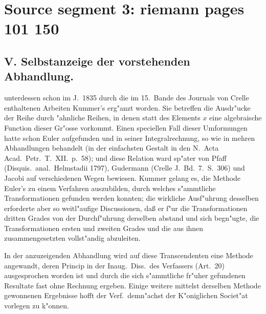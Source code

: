 \documentclass[12pt,a4paper]{book}
\theoremstyle{definition}
\theoremstyle{remark}
\begin{document}
\vspace{1em}
\tableofcontents

\clearpage
\chapter*{Source segment 3: riemann pages 101 150}
\maketitle
\thispagestyle{empty}
\tableofcontents
\newpage

\section*{V. Selbstanzeige der vorstehenden Abhandlung.}
\label{sec:selbstanzeige}

unterdessen schon im J.\ 1835 durch die im 15.\ Bande des Journals
von Crelle enthaltenen Arbeiten Kummer's erg"anzt worden. Sie betreffen
die Ausdr"ucke der Reihe durch "ahnliche Reihen, in denen statt
des Elements $x$ eine algebraische Function dieser Gr"osse vorkommt.
Einen speciellen Fall dieser Umformungen hatte schon Euler aufgefunden
und in seiner Integralrechnung, so wie in mehren Abhandlungen behandelt
(in der einfachsten Gestalt in den N.\ Acta Acad.\ Petr.\ T.\ XII.\ p.\ 58);
und diese Relation ward sp"ater von Pfaff (Disquis.\ anal.\ Helmstadii
1797), Gudermann (Crelle J.\ Bd.\ 7.\ S.\ 306) und Jacobi auf
verschiedenen Wegen bewiesen. Kummer gelang es, die Methode Euler's
zu einem Verfahren auszubilden, durch welches s"ammtliche Transformationen
gefunden werden konnten; die wirkliche Ausf"uhrung desselben erforderte
aber so weitl"aufige Discussionen, da\ss{} er f"ur die Transformationen
dritten Grades von der Durchf"uhrung derselben abstand und sich begn"ugte,
die Transformationen ersten und zweiten Grades und die aus ihnen
zusammengesetzten vollst"andig abzuleiten.

In der anzuzeigenden Abhandlung wird auf diese Transcendenten eine
Methode angewandt, deren Princip in der Inaug.\ Diss.\ des Verfassers
(Art.\ 20) ausgesprochen worden ist und durch die sich s"ammtliche
fr"uher gefundenen Resultate fast ohne Rechnung ergeben. Einige weitere
mittelst derselben Methode gewonnenen Ergebnisse hofft der Verf.\ demn"achst
der K"oniglichen Societ"at vorlegen zu k"onnen.
\end{document}
